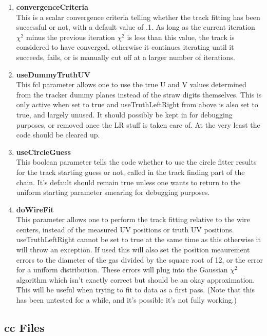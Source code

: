 \documentclass{article}
\begin{document}
\begin{enumerate}
      \item{\bf{convergenceCriteria}} \\
      This is a scalar convergence criteria telling whether the track fitting has been successful or not, with a default value of .1. As long as the current iteration $\chi^{2}$ minus the previous iteration $\chi^{2}$ is less than this value, the track is considered to have converged, otherwise it continues iterating until it succeeds, fails, or is manually cut off at a larger number of iterations.


      \item{\bf{useDummyTruthUV}} \\
      This fcl parameter allows one to use the true U and V values determined from the tracker dummy planes instead of the straw digits themselves. This is only active when set to true and useTruthLeftRight from above is also set to true, and largely unused. It should possibly be kept in for debugging purposes, or removed once the LR stuff is taken care of. At the very least the code should be cleared up.

      \item{\bf{useCircleGuess}} \\
      This boolean parameter tells the code whether to use the circle fitter results for the track starting guess or not, called in the track finding part of the chain. It's default should remain true unless one wants to return to the uniform starting parameter smearing for debugging purposes.

      \item{\bf{doWireFit}} \\
      This parameter allows one to perform the track fitting relative to the wire centers, instead of the measured UV positions or truth UV positions. useTruthLeftRight cannot be set to true at the same time as this otherwise it will throw an exception. If used this will also set the position meaurement errors to the diameter of the gas divided by the square root of 12, or the error for a uniform distribution. These errors will plug into the Gaussian $\chi^{2}$ algorithm which isn't exactly correct but should be an okay approximation. This will be useful when trying to fit to data as a first pass. (Note that this has been untested for a while, and it's possible it's not fully working.)



    \end{enumerate}


  \subsection{cc Files}
\end{document}
